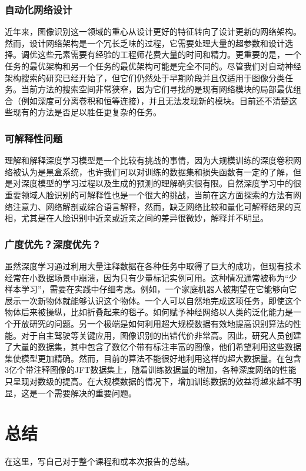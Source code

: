 \documentclass{article}
\begin{document}
\subsubsection{自动化网络设计} 
近年来，图像识别这一领域的重心从设计更好的特征转向了设计更新的网络架构。然而，设计网络架构是一个冗长乏味的过程，它需要处理大量的超参数和设计选择。调优这些元素需要有经验的工程师花费大量的时间和精力。更重要的是，一个任务的最优架构和另一个任务的最优架构可能是完全不同的。尽管我们对自动神经架构搜索的研究已经开始了，但它们仍然处于早期阶段并且仅适用于图像分类任务。当前方法的搜索空间非常狭窄，因为它们寻找的是现有网络模块的局部最优组合（例如深度可分离卷积和恒等连接），并且无法发现新的模块。目前还不清楚这些现有的方法是否足以胜任更复杂的任务。
\subsubsection{可解释性问题}
理解和解释深度学习模型是一个比较有挑战的事情，因为大规模训练的深度卷积网络被认为是黑盒系统，也许我们可以对训练的数据集和损失函数有一定的了解，但是对深度模型的学习过程以及生成的预测的理解确实很有限。自然深度学习中的很重要领域人脸识别的可解释性也是一个很大的挑战，当前在这方面探索的方法有网络注意力、网络解剖或综合语言解释，然而，缺乏网络比较和量化可解释结果的真相，尤其是在人脸识别中近亲或近亲之间的差异很微妙，解释并不明显。
\subsubsection{广度优先？深度优先？}
虽然深度学习通过利用大量注释数据在各种任务中取得了巨大的成功，但现有技术经常在小数据场景中崩溃，因为只有少量标记实例可用。这种情况通常被称为“少样本学习”，需要在实践中仔细考虑。例如，一个家庭机器人被期望在它能够向它展示一次新物体就能够认识这个物体。一个人可以自然地完成这项任务，即使这个物体后来被操纵，比如折叠起来的毯子。如何赋予神经网络以人类的泛化能力是一个开放研究的问题。另一个极端是如何利用超大规模数据有效地提高识别算法的性能。对于自主驾驶等关键应用，图像识别的出错代价非常高。因此，研究人员创建了大量的数据集，其中包含了数亿个带有标注丰富的图像，他们希望利用这些数据集使模型更加精确。然而，目前的算法不能很好地利用这样的超大数据量。在包含3亿个带注释图像的JFT数据集上，随着训练数据量的增加，各种深度网络的性能只呈现对数级的提高。在大规模数据的情况下，增加训练数据的效益将越来越不明显，这是一个需要解决的重要问题。
\section{总结}

在这里，写自己对于整个课程和或本次报告的总结。\par
\end{document}
